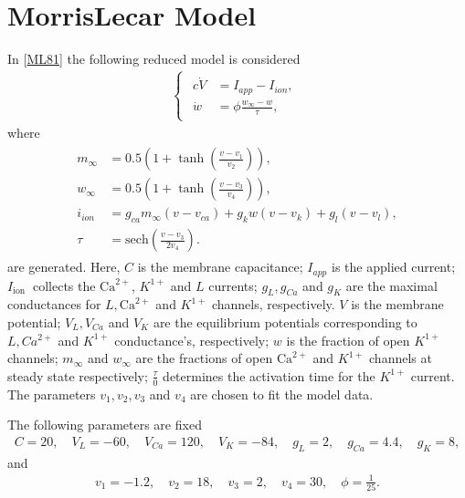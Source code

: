 \documentclass[letterpaper,10pt,english]{jupyterBook}
\begin{document}
\chapter{Morris\sphinxhyphen{}Lecar Model}
\label{\detokenize{Morris-Lecar:morris-lecar-model}}\label{\detokenize{Morris-Lecar::doc}}
\sphinxAtStartPar
In {[}\hyperlink{cite.references:id4}{ML81}{]} the following reduced model is considered
\begin{equation*}
\begin{split}
\begin{cases}
\begin{aligned}
c\dot V &= I_{app} - I_{ion}, \\
\dot w &= \phi \frac{w_\infty -w}{\tau},
\end{aligned}
\end{cases}
\end{split}
\end{equation*}
\sphinxAtStartPar
where
\begin{equation*}
\begin{split}
\begin{aligned}
m_\infty &= 0.5 \left(1+\tanh\left(\frac{v-v_1}{v_2}\right)\right), \\
w_\infty &= 0.5 \left(1+\tanh\left(\frac{v-v_3}{v_4}\right)\right), \\
i_{ion} &= g_{ca} m_{\infty} (v-v_{ca}) + g_k w (v-v_k) + g_l (v-v_l), \\
\tau &= \text{sech}\left(\frac{v-v_3}{2v_4}\right).
\end{aligned}
\end{split}
\end{equation*}
\sphinxAtStartPar
are generated. Here, \(C\) is the membrane capacitance; \(I_{a p p}\)
is the applied current; \(I_{\text {ion }}\) collects the \(\mathrm{Ca}^{2+}\),
\(K^{1+}\) and \(L\) currents; \(g_{L}, g_{C a}\) and \(g_{K}\) are the maximal
conductances for \(L, \mathrm{Ca}^{2+}\) and \(K^{1+}\) channels, respectively. \(V\)
is the membrane potential; \(V_{L}, V_{C a}\) and \(V_{K}\) are the equilibrium
potentials corresponding to \(L, C a^{2+}\) and \(K^{1+}\) conductance’s,
respectively; \(w\) is the fraction of open \(K^{1+}\) channels; \(m_{\infty}\) and
\(w_{\infty}\) are the fractions of open \(\mathrm{Ca}^{2+}\) and \(K^{1+}\) channels
at steady state respectively; \(\frac{\tau}{0}\) determines the activation time
for the \(K^{1+}\) current. The parameters \(v_{1}, v_{2}, v_{3}\) and \(v_{4}\) are
chosen to fit the model data.

\sphinxAtStartPar
The following parameters are fixed
\begin{equation*}
\begin{split}
C=20, \quad V_{L}=-60, \quad V_{C a}=120, \quad V_{K}=-84, \quad g_{L}=2, \quad
g_{C a}= 4.4, \quad g_{K}=8,
\end{split}
\end{equation*}
\sphinxAtStartPar
and
\begin{equation*}
\begin{split}
v_{1}=-1.2, \quad v_{2}=18, \quad v_{3}=2, \quad v_{4}=30, \quad
\phi=\frac{1}{25}.
\end{split}
\end{equation*}
\end{document}
